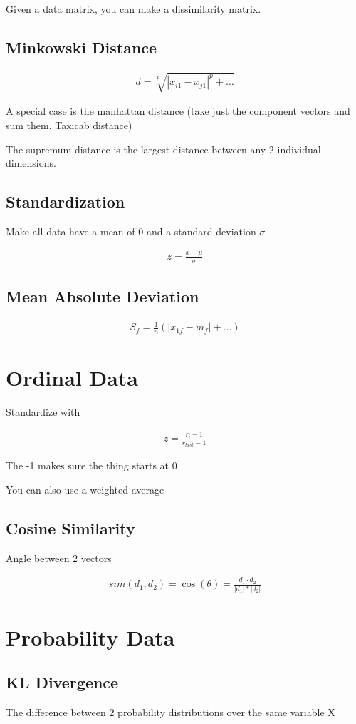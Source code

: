 \documentclass[fleqn]{report}
\newcommand{\equations} [1] {
\begin{gather*}
#1
\end{gather*}
}
\begin{document}
Given a data matrix, you can make a dissimilarity matrix.

\subsection{Minkowski Distance}
\equations{
    d 
    =
    \sqrt[p]{|x_{i1} - x_{j1}|^p + \ldots}
}

A special case is the manhattan distance (take just the component vectors 
and sum them. Taxicab distance)

The supremum distance is the largest distance between any 2 individual dimensions.

\subsection{Standardization}
Make all data have a mean of 0 and a standard deviation $\sigma$

\equations{
    z 
    =
    \frac{x - \mu}{\sigma}
}

\subsection{Mean Absolute Deviation}
\equations{
    S_f 
    =
    \frac{1}{n}
    (|x_{1f} - m_{f}| + \ldots)
}

\section{Ordinal Data}
Standardize with 
\equations{
    z 
    =
    \frac{r_i - 1}{r_{last} - 1}
}
The -1 makes sure the thing starts at 0 

You can also use a weighted average 

\subsection{Cosine Similarity}
Angle between 2 vectors 

\equations{
    sim(d_1, d_2) = \cos(\theta)
    =
    \frac{d_1 \cdot d_2}{|d_1|*|d_2|}
}

\section{Probability Data}
\subsection{KL Divergence}
The difference between 2 probability distributions over the same variable X 
\end{document}
